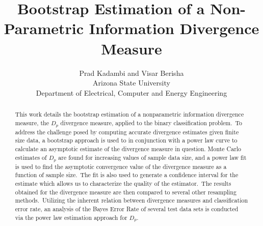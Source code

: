 \documentclass{article}
\begin{document}
	
	\title{Bootstrap Estimation of a Non-Parametric Information Divergence Measure}
	\author { Prad Kadambi and Visar Berisha \\
		\small Arizona State University \\
		\small Department of Electrical, Computer and Energy Engineering}
	\date{}
	\maketitle
	
	\begin{abstract}
		
		This work details the bootstrap estimation of a nonparametric information divergence measure, the $D_p$ divergence measure, applied to the binary classification problem.\ To address the challenge posed by computing accurate divergence estimates given finite size data, a bootstrap approach is used to in conjunction with a power law curve to calculate an asymptotic estimate of the divergence measure in question. Monte Carlo estimates of $D_p$ are found for increasing values of sample data size, and a power law fit is used to find the asymptotic convergence value of the divergence measure as a function of sample size.\ The fit is also used to generate a confidence interval for the estimate which allows us to characterize the quality of the estimator.\ The results obtained for the divergence measure are then compared to several other resampling methods.\  Utilizing the inherent relation between divergence measures and classification error rate, an analysis of the Bayes Error Rate of several test data sets is conducted via the power law estimation approach for $D_p$.
	\end{abstract}
	
\end{document}

